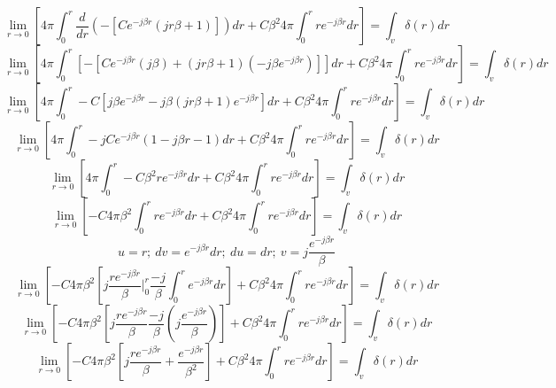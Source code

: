 \begin{dmath*}
\lim\limits_{r\rightarrow0} \left[4\pi\int_{0}^{r}\frac{d}{dr}\left(-[{C} e^{-j\beta r}(jr\beta+1)]\right)dr + C\beta^{2}4\pi\int_{0}^{r}re^{-j\beta r}dr\right] = \int_{v}\delta(r)dr
\end{dmath*}
\begin{dmath*}
\lim\limits_{r\rightarrow0} \left[4\pi\int_{0}^{r}\left[-[{C} e^{-j\beta r}(j\beta) + (jr\beta+1)(-j\beta e^{-j\beta r})]\right]dr + C\beta^{2}4\pi\int_{0}^{r}re^{-j\beta r}dr\right] = \int_{v}\delta(r)dr
\end{dmath*}
\begin{dmath*}
\lim\limits_{r\rightarrow0} \left[4\pi\int_{0}^{r}-C[j\beta e^{-j\beta r}-j\beta(jr\beta+1)e^{-j\beta r}]dr + C\beta^{2}4\pi\int_{0}^{r}re^{-j\beta r}dr\right] = \int_{v}\delta(r)dr
\end{dmath*}
\begin{dmath*}
\lim\limits_{r\rightarrow0} \left[4\pi\int_{0}^{r}-jCe^{-j\beta r}(1-j\beta r-1)dr + C\beta^{2}4\pi\int_{0}^{r}re^{-j\beta r}dr\right] = \int_{v}\delta(r)dr
\end{dmath*}
\begin{dmath*}
\lim\limits_{r\rightarrow0} \left[4\pi\int_{0}^{r}-C\beta^{2}re^{-j\beta r}dr + C\beta^{2}4\pi\int_{0}^{r}re^{-j\beta r}dr\right] = \int_{v}\delta(r)dr
\end{dmath*}
\begin{dmath*}
\lim\limits_{r\rightarrow0} \left[-C4\pi\beta^{2}\int_{0}^{r}re^{-j\beta r}dr + C\beta^{2}4\pi\int_{0}^{r}re^{-j\beta r}dr\right] = \int_{v}\delta(r)dr
\end{dmath*}
$$u = r;\ dv=e^{-j\beta r}dr;\ du=dr;\ v=j\frac{e^{-j\beta r}}{\beta}$$
\begin{dmath*}
\lim\limits_{r\rightarrow0} \left[-C4\pi\beta^{2}\left[j\frac{re^{-j\beta r}}{\beta}\bigg\vert_{0}^{r}\frac{-j}{\beta}\int_{0}^{r}e^{-j\beta r}dr\right] + C\beta^{2}4\pi\int_{0}^{r}re^{-j\beta r}dr\right] = \int_{v}\delta(r)dr
\end{dmath*}
\begin{dmath*}
\lim\limits_{r\rightarrow0} \left[-C4\pi\beta^{2}\left[j\frac{re^{-j\beta r}}{\beta}  \frac{-j}{\beta}\left(j\frac{e^{-j\beta r}}{\beta}\right)\right] + C\beta^{2}4\pi\int_{0}^{r}re^{-j\beta r}dr\right] = \int_{v}\delta(r)dr
\end{dmath*}
\begin{dmath*}
\lim\limits_{r\rightarrow0} \left[-C4\pi\beta^{2}\left[j\frac{re^{-j\beta r}}{\beta}  +\frac{e^{-j\beta r}}{\beta^{2}}\right] + C\beta^{2}4\pi\int_{0}^{r}re^{-j\beta r}dr\right] = \int_{v}\delta(r)dr
\end{dmath*}
